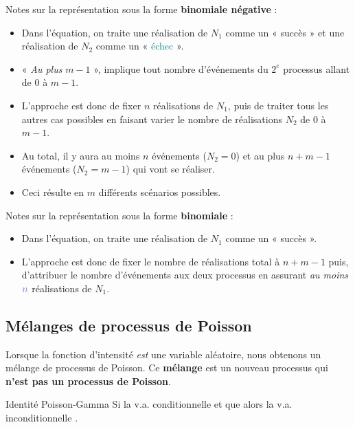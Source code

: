 \documentclass[10pt, french]{article}
\begin{document}
\begin{multicols*}{2}
Notes sur la représentation sous la forme \textbf{binomiale négative} :
\begin{itemize}
	\item	Dans l'équation, on traite une réalisation de $N_{1}$ comme un « \textcolor{amethyst}{succès} » et une réalisation de $N_{2}$ comme un « \textcolor{teal}{échec} ».
	\item	« \textit{Au plus} $m - 1$ », implique tout nombre d'événements du $2^{e}$ processus allant de $0$ à $m - 1$. 
	\item	L'approche est donc de fixer $n$ réalisations de $N_{1}$, puis de traiter tous les autres cas possibles en faisant varier le nombre de réalisations $N_{2}$ de $0$ à $m - 1$.
	\item	Au total, il y aura au moins $n$ événements ($N_{2} = 0$) et au plus $n + m - 1$ événements  ($N_{2} = m - 1$) qui vont se réaliser.
	\item	Ceci résulte en $m$ différents scénarios possibles. 
\end{itemize}

Notes sur la représentation sous la forme \textbf{binomiale} :
\begin{itemize}
	\item	Dans l'équation, on traite une réalisation de $N_{1}$ comme un « \textcolor{amethyst}{succès} ».
	\item	L'approche est donc de fixer le nombre de réalisations total à $n + m - 1$ puis, d'attribuer le nombre d'événements aux deux processus en assurant \textit{au moins} $\textcolor{amethyst}{n}$ réalisations de $N_{1}$.
\end{itemize}


\columnbreak
\subsection{Mélanges de processus de Poisson}
Lorsque la fonction d'intensité \textit{est} une variable aléatoire, nous obtenons un mélange de processus de Poisson. Ce \textbf{mélange} est un nouveau processus qui \textbf{n'est pas un processus de Poisson}.

\begin{rappel}{Identité Poisson-Gamma}
Si la v.a. conditionnelle  et que  alors la v.a. inconditionnelle .
\end{rappel}



\end{multicols*}
\end{document}
